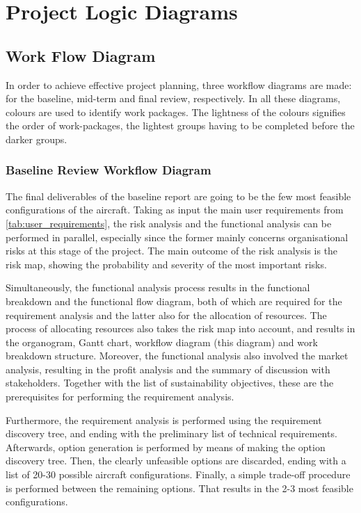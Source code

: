\chapter{Project Logic Diagrams}


\section{Work Flow Diagram}
 In order to achieve effective project planning, three workflow diagrams are made: for the baseline, mid-term and final review, respectively. In all these diagrams, colours are used to identify work packages. The lightness of the colours signifies the order of work-packages, the lightest groups having to be completed before the darker groups.

\subsection*{Baseline Review Workflow Diagram}
The final deliverables of the baseline report are going to be the few most feasible configurations of the aircraft.
Taking as input the main user requirements from \autoref{tab:user_requirements}, the risk analysis and the functional analysis can be performed in parallel, especially since the former mainly concerns organisational risks at this stage of the project. The main outcome of the risk analysis is the risk map, showing the probability and severity of the most important risks. 

Simultaneously, the functional analysis process results in the functional breakdown and the functional flow diagram, both of which are required for the requirement analysis and the latter also for the allocation of resources. The process of allocating resources also takes the risk map into account, and results in the organogram, Gantt chart, workflow diagram (this diagram) and work breakdown structure. Moreover, the functional analysis also involved the market analysis, resulting in the profit analysis and the summary of discussion with stakeholders. Together with the list of sustainability objectives, these are the prerequisites for performing the requirement analysis.

Furthermore, the requirement analysis is performed using the requirement discovery tree, and ending with the preliminary list of technical requirements. Afterwards, option generation is performed by means of making the option discovery tree. Then, the clearly unfeasible options are discarded, ending with a list of 20-30 possible aircraft configurations. Finally, a simple trade-off procedure is performed between the remaining options. That results in the 2-3 most feasible configurations.

